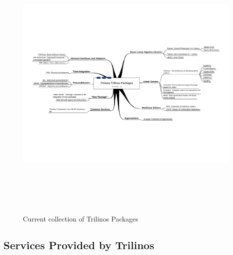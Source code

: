 \documentclass[acmtoms,acmnow]{acmtrans2m}
\begin{document}
\begin{figure}
\begin{center}
\includegraphics[height=5.5in,angle=90]{../CommonFiles/TrilinosPackagesDiagram}
\end{center}
\caption{\label{Figure:TrilinosPackages}Current collection of Trilinos Packages}
\end{figure}

\subsection{Services Provided by Trilinos}
\end{document}
